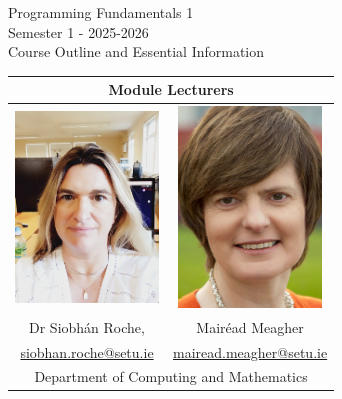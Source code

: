 \documentclass{article}
\author{Siobh\'an Roche, Mair\'ead Meagher, S.E.T.U.}
\newcommand\fullExTitle{Programming Fundamentals 1 \\Semester 1 - 2025-2026}
\begin{document}
\begin{Huge}
	\begin{center}
	\fullExTitle \\
    \vspace{1cm}
    Course Outline and Essential Information
    \vspace{.1cm}
    \end{center}
\end{Huge}
\vspace{1.5cm}
\begin{center}
    \begin{tabular}{|c |  c | }
    \hline
    \multicolumn{2}{|c|}{Module Lecturers} \\
    \hline
    \includegraphics[width=1.5in]{img/siobhan3.png} &          \includegraphics[width=1.5in]{img/mairead.png} \\ 

       Dr Siobh\'an Roche, & Mair\'ead Meagher  \\  
       \href{mailto:siobhan.roche@setu.ie}{siobhan.roche@setu.ie} & \href{mailto:mairead.meagher@setu.ie}{mairead.meagher@setu.ie} \\
  
    \hline
    \multicolumn{2}{|c|}{Department of Computing and Mathematics} \\
     \hline

  
    \end{tabular}
\end{center}
\end{document}
